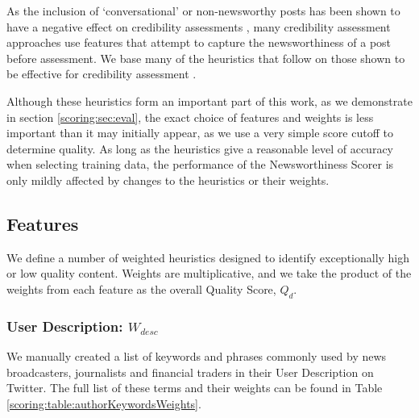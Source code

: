 As the inclusion of `conversational' or non-newsworthy posts has been shown to have a negative effect on credibility assessments \citep{Noyunsan17,Sikdar13-2}, many credibility assessment approaches use features that attempt to capture the newsworthiness of a post before assessment.
We base many of the heuristics that follow on those shown to be effective for credibility assessment \citep{Sikdar13, Kang12, Castillo11, Madhawa15}.



Although these heuristics form an important part of this work, as we demonstrate in section \ref{scoring:sec:eval}, the exact choice of features and weights is less important than it may initially appear, as we use a very simple score cutoff to determine quality. As long as the heuristics give a reasonable level of accuracy when selecting training data, the performance of the Newsworthiness Scorer is only mildly affected by changes to the heuristics or their weights.

\subsection{Features}
We define a number of weighted heuristics designed to identify exceptionally high or low quality content. Weights are multiplicative, and we take the product of the weights from each feature as the overall Quality Score, \(Q_d\).

\subsubsection{User Description: \(W_{desc}\)}
We manually created a list of keywords and phrases commonly used by news broadcasters, journalists and financial traders in their User Description on Twitter. The full list of these terms and their weights can be found in Table \ref{scoring:table:authorKeywordsWeights}.

